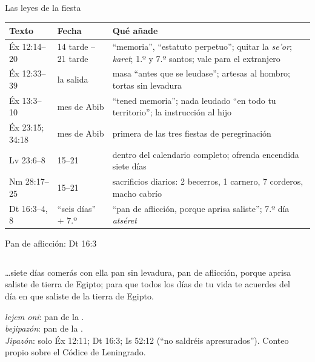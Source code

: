 \begin{frame}{Las leyes de la fiesta}
\scriptsize\renewcommand{\arraystretch}{1.13}
\begin{tabular}{@{}L{1.9cm}L{2.5cm}L{7.6cm}@{}}
\toprule
\textbf{Texto} & \textbf{Fecha} & \textbf{Qué añade} \\ \midrule
Éx 12:14--20 & 14 tarde -- 21 tarde & ``memoria'', ``estatuto perpetuo''; quitar la \emph{se'or}; \emph{karet}; 1.º y 7.º santos; vale para el extranjero \\
Éx 12:33--39 & la salida & masa ``antes que se leudase''; artesas al hombro; tortas sin levadura \\
Éx 13:3--10 & mes de Abib & ``tened memoria''; nada leudado ``en todo tu territorio''; la instrucción al hijo \\
Éx 23:15; 34:18 & mes de Abib & primera de las tres fiestas de peregrinación \\
Lv 23:6--8 & 15--21 & dentro del calendario completo; ofrenda encendida siete días \\
Nm 28:17--25 & 15--21 & sacrificios diarios: 2 becerros, 1 carnero, 7 corderos, macho cabrío \\
Dt 16:3--4, 8 & ``seis días'' + 7.º & ``pan de aflicción, porque aprisa saliste''; 7.º día \emph{atséret} \\
\bottomrule
\end{tabular}\par\smallskip
{}
\end{frame}

\begin{frame}{Pan de aflicción: Dt 16:3}
\begin{columns}[c,onlytextwidth]
\begin{column}{0.57\textwidth}
\begin{cita}\ldots{}siete días comerás con ella pan sin levadura, pan de aflicción, porque aprisa saliste de tierra de Egipto; para que todos los días de tu vida te acuerdes del día en que saliste de la tierra de Egipto.\end{cita}
\small {} \emph{lejem oni}: pan de la .\\  \emph{bejipazón}: pan de la .\\[2pt]
\scriptsize \emph{Jipazón}: solo Éx 12:11; Dt 16:3; Is 52:12 (``no saldréis apresurados''). Conteo propio sobre el Códice de Leningrado.
\end{column}
\begin{column}{0.41\textwidth}\end{column}
\end{columns}
\end{frame}

